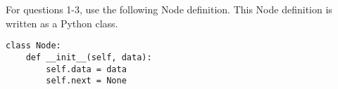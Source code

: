 \documentclass[11pt,addpoints]{exam}
\begin{document}
\pagestyle{empty}

\\
\\


%
%
%
\printanswers


%
%
\ifprintanswers
\noindent
\begin{center}
	\gradetable[v][questions]
\end{center}
\bigskip
\fi

\noindent For questions 1-3, use the following Node definition.  This Node definition is written as a  Python class.
\begin{verbatim}
class Node:
    def __init__(self, data):
        self.data = data
        self.next = None
\end{verbatim}
\end{document}
